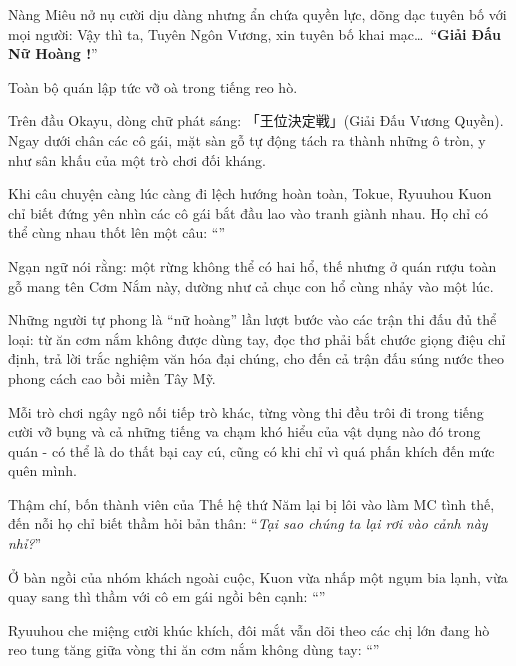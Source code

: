 \documentclass[../main.tex]{subfiles}
\begin{document}
Nàng Miêu nở nụ cười dịu dàng nhưng ẩn chứa quyền lực, dõng dạc tuyên bố với mọi người: Vậy thì ta, Tuyên Ngôn Vương, xin tuyên bố khai mạc\dots\ ``\textbf{Giải Đấu Nữ Hoàng \hll!}''

Toàn bộ quán lập tức vỡ oà trong tiếng reo hò.

Trên đầu Okayu, dòng chữ phát sáng: 「王位決定戦」(Giải Đấu Vương Quyền). Ngay dưới chân các cô gái, mặt sàn gỗ tự động tách ra thành những ô tròn, y như sân khấu của một trò chơi đối kháng.

Khi câu chuyện càng lúc càng đi lệch hướng hoàn toàn, Tokue, Ryuuhou Kuon chỉ biết đứng yên nhìn các cô gái bắt đầu lao vào tranh giành nhau. Họ chỉ có thể cùng nhau thốt lên một câu: ``''


\omk

Ngạn ngữ nói rằng: một rừng không thể có hai hổ, thế nhưng ở quán rượu toàn gỗ mang tên Cơm Nắm này, dường như cả chục con hổ cùng nhảy vào một lúc.

Những người tự phong là ``nữ hoàng'' lần lượt bước vào các trận thi đấu đủ thể loại: từ ăn cơm nắm không được dùng tay, đọc thơ phải bắt chước giọng điệu chỉ định, trả lời trắc nghiệm văn hóa đại chúng, cho đến cả trận đấu súng nước theo phong cách cao bồi miền Tây Mỹ.

Mỗi trò chơi ngây ngô nối tiếp trò khác, từng vòng thi đều trôi đi trong tiếng cười vỡ bụng và cả những tiếng va chạm khó hiểu của vật dụng nào đó trong quán - có thể là do thất bại cay cú, cũng có khi chỉ vì quá phấn khích đến mức quên mình.

Thậm chí, bốn thành viên của Thế hệ thứ Năm lại bị lôi vào làm MC tình thế, đến nỗi họ chỉ biết thầm hỏi bản thân: ``\textit{Tại sao chúng ta lại rơi vào cảnh này nhỉ?}''

Ở bàn ngồi của nhóm khách ngoài cuộc, Kuon vừa nhấp một ngụm bia lạnh, vừa quay sang thì thầm với cô em gái ngồi bên cạnh: ``''

Ryuuhou che miệng cười khúc khích, đôi mắt vẫn dõi theo các chị lớn đang hò reo tung tăng giữa vòng thi ăn cơm nắm không dùng tay: ``''
\end{document}
